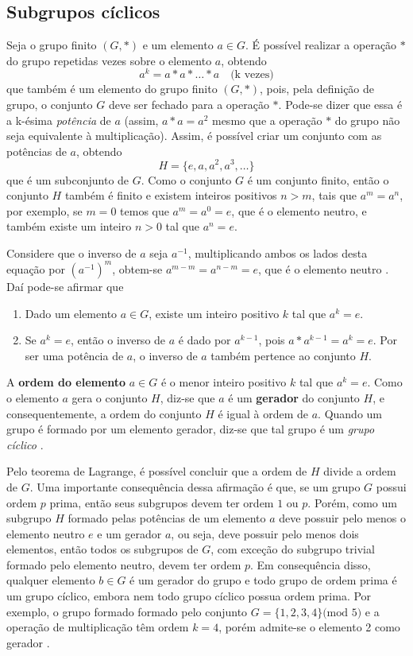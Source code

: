 \subsection{Subgrupos cíclicos}
Seja o grupo finito $(G,*)$ e um elemento $a \in G$. É possível realizar a operação $*$ do grupo repetidas vezes sobre o elemento $a$, obtendo
$$
a^k = a * a * \ldots * a \quad\mbox{(k vezes)}
$$
que também é um elemento do grupo finito $(G,*)$, pois, pela definição de grupo, o conjunto \(G\) deve ser fechado para a operação \(*\). Pode-se dizer que essa é a k-ésima \textit{potência} de $a$ (assim, \(a * a = a^2\) mesmo que a operação $*$ do grupo não seja equivalente à multiplicação). 
Assim, é possível criar um conjunto com as potências de $a$, obtendo
$$
H = \{e, a, a^2, a^3, \ldots\}
$$
que é um subconjunto de $G$. Como o conjunto $G$ é um conjunto finito, então o conjunto $H$ também é finito e existem inteiros positivos $n > m$, tais que $a^m = a^n$, por exemplo, se \(m = 0\) temos que \(a^m = a^0 = e\), que é o elemento neutro, e também existe um inteiro \(n > 0\) tal que \(a^n = e\). 

Considere que o inverso de $a$ seja $a^{-1}$, multiplicando ambos os lados desta equação por $(a^{-1})^m$, obtem-se $a^{m - m} = a^{n-m} = e$, que é o elemento neutro \cite{Coutinho:2014}. Daí pode-se afirmar que
\begin{enumerate}
\item Dado um elemento $a \in G$, existe um inteiro positivo $k$ tal que $a^k = e$.
\item Se $a^k = e$, então o inverso de $a$ é dado por $a^{k-1}$, pois $a * a^{k-1} = a^k = e$. Por ser uma potência de $a$, o inverso de $a$ também pertence ao conjunto $H$.
\end{enumerate}

A \textbf{ordem do elemento} $a \in G$ é o menor inteiro positivo $k$ tal que $a^k = e$. Como o elemento $a$ gera o conjunto $H$, diz-se que $a$ é um \textbf{gerador} do conjunto $H$, e consequentemente, a ordem do conjunto $H$ é igual à ordem de $a$. Quando um grupo é formado por um elemento gerador, diz-se que tal grupo é um \textit{grupo cíclico} \cite{Coutinho:2014}.

Pelo teorema de Lagrange, é possível concluir que a ordem de $H$ divide a ordem de $G$. Uma importante consequência dessa afirmação é que, se um grupo $G$ possui ordem $p$ prima, então seus subgrupos devem ter ordem $1$ ou $p$. Porém, como um subgrupo $H$ formado pelas potências de um elemento $a$ deve possuir pelo menos o elemento neutro $e$ e um gerador $a$, ou seja, deve possuir pelo menos dois elementos, então todos os subgrupos de $G$, com exceção do subgrupo trivial formado pelo elemento neutro, devem ter ordem $p$. Em consequência disso, qualquer elemento $b \in G$ é um gerador do grupo e todo grupo de ordem prima é um grupo cíclico, embora nem todo grupo cíclico possua ordem prima. Por exemplo, o grupo formado formado pelo conjunto $G=\{1,2,3,4\} \mbox{(mod 5)}$ e a operação de multiplicação têm ordem $k = 4$, porém admite-se o elemento 2 como gerador \cite{Coutinho:2014}.

